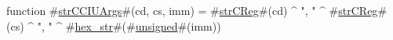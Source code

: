 function #\hyperref[sailMIPSzstrCCIUArgs]{strCCIUArgs}#(cd, cs, imm) = #\hyperref[sailMIPSzstrCReg]{strCReg}#(cd) ^ ", " ^ #\hyperref[sailMIPSzstrCReg]{strCReg}#(cs) ^ ", " ^ #\hyperref[sailMIPSzhexzystr]{hex\_str}#(#\hyperref[sailMIPSzunsigned]{unsigned}#(imm))
